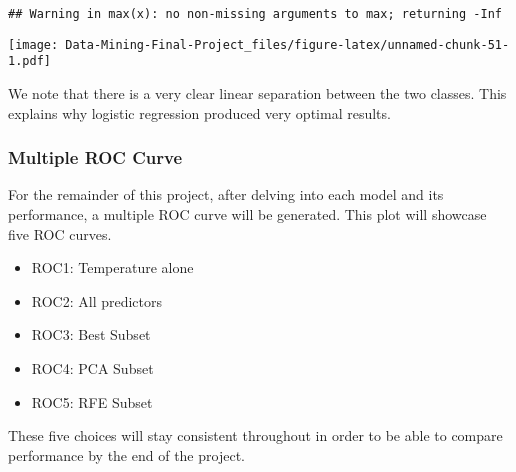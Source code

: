 \documentclass[
]{article}
\begin{document}
\begin{verbatim}
## Warning in max(x): no non-missing arguments to max; returning -Inf
\end{verbatim}

\texttt{[image: Data-Mining-Final-Project\_files/figure-latex/unnamed-chunk-51-1.pdf]}

We note that there is a very clear linear separation between the two
classes. This explains why logistic regression produced very optimal
results.

\subsubsection{Multiple ROC Curve}\label{multiple-roc-curve}

For the remainder of this project, after delving into each model and its
performance, a multiple ROC curve will be generated. This plot will
showcase five ROC curves.

\begin{itemize}
\item
  ROC1: Temperature alone
\item
  ROC2: All predictors
\item
  ROC3: Best Subset
\item
  ROC4: PCA Subset
\item
  ROC5: RFE Subset
\end{itemize}

These five choices will stay consistent throughout in order to be able
to compare performance by the end of the project.
\end{document}
